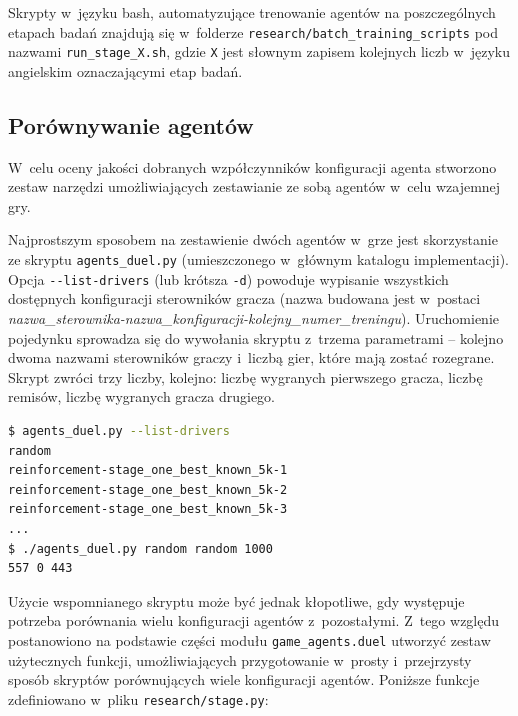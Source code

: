 \documentclass[a4paper, 12pt, oneside]{report}
\begin{document}
\begin{sloppypar}
Skrypty w~języku bash, automatyzujące trenowanie agentów na poszczególnych etapach badań znajdują się w~folderze \texttt{research/batch\_training\_scripts} pod nazwami \texttt{run\_stage\_X.sh}, gdzie \texttt{X} jest słownym zapisem kolejnych liczb w~języku angielskim oznaczającymi etap badań.
\end{sloppypar}

\subsection{Porównywanie agentów}

 W~celu oceny jakości dobranych wzpółczynników konfiguracji agenta stworzono zestaw narzędzi umożliwiających zestawianie ze sobą agentów w~celu wzajemnej gry.

\begin{sloppypar}
Najprostszym sposobem na zestawienie dwóch agentów w~grze jest skorzystanie ze skryptu \texttt{agents\_duel.py} (umieszczonego w~głównym katalogu implementacji). Opcja \texttt{-{-}list-drivers} (lub krótsza \texttt{-d}) powoduje wypisanie wszystkich dostępnych konfiguracji sterowników gracza (nazwa budowana jest w~postaci \emph{nazwa\_sterownika-nazwa\_konfiguracji-kolejny\_numer\_treningu}). Uruchomienie pojedynku sprowadza się do wywołania skryptu z~trzema parametrami -- kolejno dwoma nazwami sterowników graczy i~liczbą gier, które mają zostać rozegrane. Skrypt zwróci trzy liczby, kolejno: liczbę wygranych pierwszego gracza, liczbę remisów, liczbę wygranych gracza drugiego.
\end{sloppypar}

\begin{lstlisting}[language=bash,caption=Przykładowe wywołanie skryptu \texttt{agents\_duel.py}]
$ agents_duel.py --list-drivers
random
reinforcement-stage_one_best_known_5k-1
reinforcement-stage_one_best_known_5k-2
reinforcement-stage_one_best_known_5k-3
...
$ ./agents_duel.py random random 1000
557 0 443
\end{lstlisting}

Użycie wspomnianego skryptu może być jednak kłopotliwe, gdy występuje potrzeba porównania wielu konfiguracji agentów z~pozostałymi. Z~tego względu postanowiono na podstawie części modułu \texttt{game\_agents.duel}  utworzyć zestaw użytecznych funkcji, umożliwiających przygotowanie w~prosty i~przejrzysty sposób skryptów porównujących wiele konfiguracji agentów. Poniższe funkcje zdefiniowano w~pliku \texttt{research/stage.py}:
\end{document}

